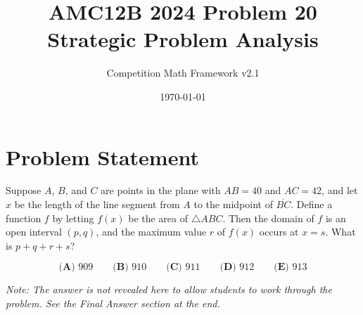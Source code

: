 \documentclass[12pt]{article}
\begin{document}
\title{AMC12B 2024 Problem 20\\Strategic Problem Analysis}
\author{Competition Math Framework v2.1}
\date{\today}
\maketitle

\section*{Problem Statement}

Suppose $A$, $B$, and $C$ are points in the plane with $AB=40$ and $AC=42$, and let $x$ be the length of the line segment from $A$ to the midpoint of $\overline{BC}$. Define a function $f$ by letting $f(x)$ be the area of $\triangle ABC$. Then the domain of $f$ is an open interval $(p,q)$, and the maximum value $r$ of $f(x)$ occurs at $x=s$. What is $p+q+r+s$?

$$\textbf{(A) }909\qquad \textbf{(B) }910\qquad \textbf{(C) }911\qquad \textbf{(D) }912\qquad \textbf{(E) }913$$

\vspace{0.3cm}
\noindent\textit{Note: The answer is not revealed here to allow students to work through the problem. See the Final Answer section at the end.}
\end{document}
